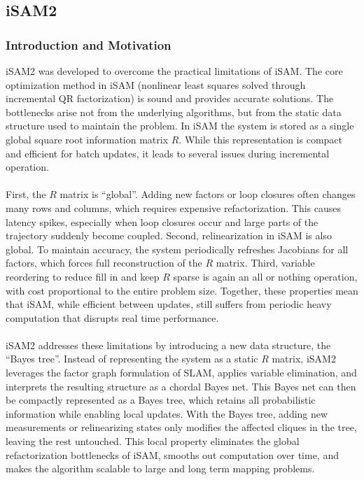 \subsection{iSAM2}
\subsubsection{Introduction and Motivation}
\gls{iSAM}2 was developed to overcome the practical limitations of \gls{iSAM}. The core optimization method in \gls{iSAM} (nonlinear least squares solved through incremental QR factorization) is sound and provides accurate solutions. The bottlenecks arise not from the underlying algorithms, but from the static data structure used to maintain the problem. In \gls{iSAM} the system is stored as a single global square root information matrix $R$. While this representation is compact and efficient for batch updates, it leads to several issues during incremental operation.
\\ \\
First, the $R$ matrix is ``global''. Adding new factors or loop closures often changes many rows and columns, which requires expensive refactorization. This causes latency spikes, especially when loop closures occur and large parts of the trajectory suddenly become coupled. Second, relinearization in \gls{iSAM} is also global. To maintain accuracy, the system periodically refreshes Jacobians for all factors, which forces full reconstruction of the $R$ matrix. Third, variable reordering to reduce fill in and keep $R$ sparse is again an all or nothing operation, with cost proportional to the entire problem size. Together, these properties mean that \gls{iSAM}, while efficient between updates, still suffers from periodic heavy computation that disrupts real time performance.
\\ \\
\gls{iSAM}2 addresses these limitations by introducing a new data structure, the ``Bayes tree''. Instead of representing the system as a static $R$ matrix, \gls{iSAM}2 leverages the factor graph formulation of \gls{SLAM}, applies variable elimination, and interprets the resulting structure as a chordal Bayes net. This Bayes net can then be compactly represented as a Bayes tree, which retains all probabilistic information while enabling local updates. With the Bayes tree, adding new measurements or relinearizing states only modifies the affected cliques in the tree, leaving the rest untouched. This local property eliminates the global refactorization bottlenecks of \gls{iSAM}, smooths out computation over time, and makes the algorithm scalable to large and long term mapping problems. \cite{iSAM2_paper,Bayes_tree_for_SLAM_paper}



